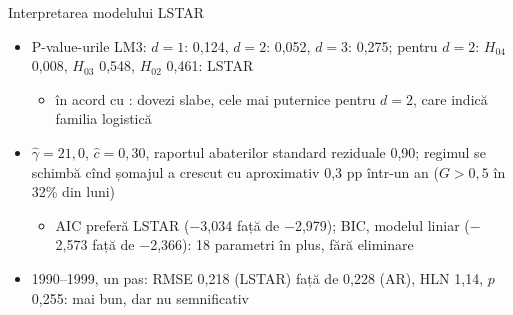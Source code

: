 \begin{frame}{Interpretarea modelului LSTAR}
\itemsize{\footnotesize}
\begin{itemize}
    \item P-value-urile LM3: $d = 1$: 0{,}124, $d = 2$: 0{,}052, $d = 3$: 0{,}275; pentru $d = 2$: $H_{04}$ 0{,}008, $H_{03}$ 0{,}548, $H_{02}$ 0{,}461: LSTAR
    \begin{itemize}
        \item în acord cu : dovezi slabe, cele mai puternice pentru $d = 2$, care indică familia logistică
    \end{itemize}
    \item $\hat\gamma = 21{,}0$, $\hat c = 0{,}30$, raportul abaterilor standard reziduale 0{,}90; regimul se schimbă cînd șomajul a crescut cu aproximativ 0,3 pp într-un an ($G > 0{,}5$ în 32\% din luni)
    \begin{itemize}
        \item AIC preferă LSTAR (\ensuremath{-}3{,}034 față de \ensuremath{-}2{,}979); BIC, modelul liniar (\ensuremath{-}2{,}573 față de \ensuremath{-}2{,}366): 18 parametri în plus, fără eliminare
    \end{itemize}
    \item 1990--1999, un pas: RMSE 0{,}218 (LSTAR) față de 0{,}228 (AR), HLN 1{,}14, $p$ 0{,}255: mai bun, dar nu semnificativ
\end{itemize}
\end{frame}

